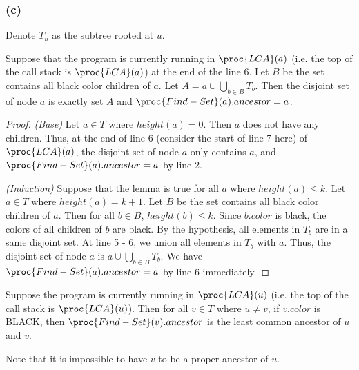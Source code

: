 \subsubsection*{(c)}

Denote $T_u$ as the subtree rooted at $u$.

\begin{lemma}
    Suppose that the program is currently running in $\proc{LCA}(a)$
    (i.e. the top of the call stack is $\proc{LCA}(a)$) at the end of the line 6.
    Let $B$ be the set contains all black color children of $a$.
    Let $A = a \cup \bigcup\limits_{b \in B} T_b$.
    Then the disjoint set of node $a$ is exactly set $A$  
    and $\proc{Find-Set}(a).ancestor = a$.
\end{lemma}

\begin{proof}
    \textit{(Base)}
    Let $a \in T$ where $height(a) = 0$.
    Then $a$ does not have any children.
    Thus, at the end of line 6 
    (consider the start of line 7 here) of $\proc{LCA}(a)$, 
    the disjoint set of node $a$ only contains $a$,
    and $\proc{Find-Set}(a).ancestor = a$ by line 2.

    \textit{(Induction)}
    Suppose that the lemma is true for all $a$ where $height(a) \leq k$.
    Let $a \in T$ where $height(a) = k + 1$.
    Let $B$ be the set contains all black color children of $a$.
    Then for all $b \in B$, $height(b) \leq k$.
    Since $b.color$ is black, the colors of all children of $b$ are black.
    By the hypothesis, all elements in $T_b$ are in a same disjoint set.
    At line 5 - 6, we union all elements in $T_b$ with $a$.
    Thus, the disjoint set of node $a$ is $a \cup \bigcup\limits_{b \in B} T_b$.
    We have $\proc{Find-Set}(a).ancestor = a$ by line 6 immediately.
\end{proof}

\begin{claim}
    Suppose the program is currently running in $\proc{LCA}(u)$
    (i.e. the top of the call stack is $\proc{LCA}(u)$).
    Then for all $v \in T$ where $u \neq v$, if $v.color$ is BLACK,
    then $\proc{Find-Set}(v).ancestor$ is the least common ancestor of $u$ and $v$.
\end{claim}

Note that it is impossible to have $v$ to be a proper ancestor of $u$.

